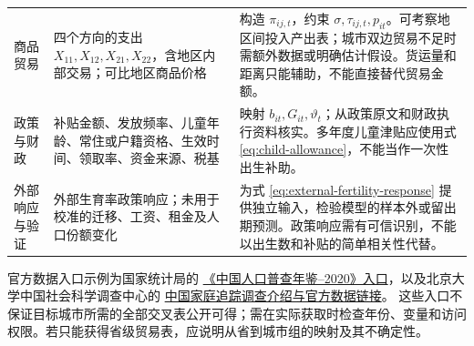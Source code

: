 \documentclass[UTF8,a4paper,zihao=-4,fontset=windows]{ctexart}
\numberwithin{equation}{section}
\begin{document}
\begin{longtable}{L{0.16\textwidth}L{0.34\textwidth}L{0.40\textwidth}}
商品贸易 & 四个方向的支出 $X_{11},X_{12},X_{21},X_{22}$，含地区内部交易；可比地区商品价格 & 构造 $\pi_{ij,t}$，约束 $\sigma,\tau_{ij,t},p_{it}$。可考察地区间投入产出表；城市双边贸易不足时需额外数据或明确估计假设。货运量和距离只能辅助，不能直接替代贸易金额。\\
政策与财政 & 补贴金额、发放频率、儿童年龄、常住或户籍资格、生效时间、领取率、资金来源、税基 & 映射 $b_{it},G_{it},\vartheta_t$；从政策原文和财政执行资料核实。多年度儿童津贴应使用式 \eqref{eq:child-allowance}，不能当作一次性出生补助。\\
外部响应与验证 & 外部生育率政策响应；未用于校准的迁移、工资、租金及人口份额变化 & 为式 \eqref{eq:external-fertility-response} 提供独立输入，检验模型的样本外或留出期预测。政策响应需有可信识别，不能以出生数和补贴的简单相关性代替。\\
\end{longtable}
\normalsize

\noindent 官方数据入口示例为国家统计局的
\href{https://www.stats.gov.cn/sj/pcsj/rkpc/7rp/zk/indexch.htm}{《中国人口普查年鉴--2020》入口}，以及北京大学中国社会科学调查中心的
\href{https://www.isss.pku.edu.cn/sjsj/cfpsxm/index.htm}{中国家庭追踪调查介绍与官方数据链接}。
这些入口不保证目标城市所需的全部交叉表公开可得；需在实际获取时检查年份、变量和访问权限。若只能获得省级贸易表，应说明从省到城市组的映射及其不确定性。
\end{document}
